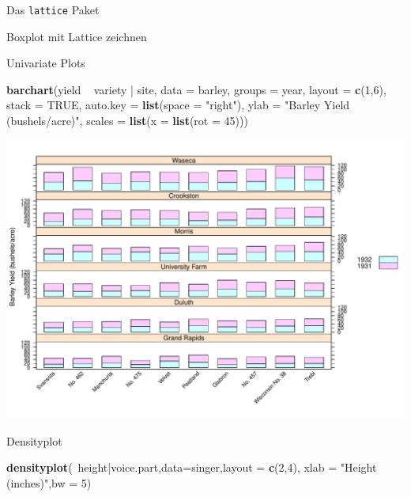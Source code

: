 \documentclass[ignorenonframetext,]{beamer}
\newenvironment{Shaded}{}{}
\newcommand{\KeywordTok}[1]{\textcolor[rgb]{0.00,0.44,0.13}{\textbf{{#1}}}}
\newcommand{\DataTypeTok}[1]{\textcolor[rgb]{0.56,0.13,0.00}{{#1}}}
\newcommand{\DecValTok}[1]{\textcolor[rgb]{0.25,0.63,0.44}{{#1}}}
\newcommand{\StringTok}[1]{\textcolor[rgb]{0.25,0.44,0.63}{{#1}}}
\newcommand{\OtherTok}[1]{\textcolor[rgb]{0.00,0.44,0.13}{{#1}}}
\newcommand{\NormalTok}[1]{{#1}}
\begin{document}
\begin{frame}[fragile]{Das \texttt{lattice} Paket}
\begin{block}{Boxplot mit Lattice zeichnen}
\end{block}

\begin{block}{Univariate Plots}

\begin{Shaded}
\begin{Highlighting}[]
\KeywordTok{barchart}\NormalTok{(yield ~}\StringTok{ }\NormalTok{variety |}\StringTok{ }\NormalTok{site, }\DataTypeTok{data =} \NormalTok{barley,}
         \DataTypeTok{groups =} \NormalTok{year, }\DataTypeTok{layout =} \KeywordTok{c}\NormalTok{(}\DecValTok{1}\NormalTok{,}\DecValTok{6}\NormalTok{), }\DataTypeTok{stack =} \OtherTok{TRUE}\NormalTok{,}
         \DataTypeTok{auto.key =} \KeywordTok{list}\NormalTok{(}\DataTypeTok{space =} \StringTok{"right"}\NormalTok{),}
         \DataTypeTok{ylab =} \StringTok{"Barley Yield (bushels/acre)"}\NormalTok{,}
         \DataTypeTok{scales =} \KeywordTok{list}\NormalTok{(}\DataTypeTok{x =} \KeywordTok{list}\NormalTok{(}\DataTypeTok{rot =} \DecValTok{45}\NormalTok{)))}
\end{Highlighting}
\end{Shaded}

\includegraphics{R_intern_files/figure-beamer/unnamed-chunk-225-1.pdf}

\end{block}

\begin{block}{Densityplot}

\begin{Shaded}
\begin{Highlighting}[]
\KeywordTok{densityplot}\NormalTok{(~height|voice.part,}\DataTypeTok{data=}\NormalTok{singer,}\DataTypeTok{layout =} \KeywordTok{c}\NormalTok{(}\DecValTok{2}\NormalTok{,}\DecValTok{4}\NormalTok{),}
            \DataTypeTok{xlab =} \StringTok{"Height (inches)"}\NormalTok{,}\DataTypeTok{bw =} \DecValTok{5}\NormalTok{)}
\end{Highlighting}
\end{Shaded}


\end{block}
\end{frame}
\end{document}

